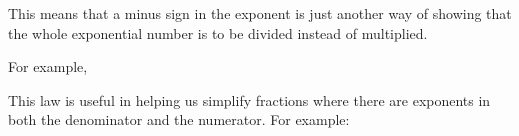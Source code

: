        \label{m38359*id64624}This means that a minus sign in the exponent is just another way of showing that the whole exponential number is to be divided instead of multiplied.\par 
        \label{m38359*id64630}For example,\par 
        \label{m38359*id64634}\nopagebreak\noindent{}
\label{m38359*eip-294}This law is useful in helping us simplify fractions where there are exponents in both the denominator and the numerator. For example:
